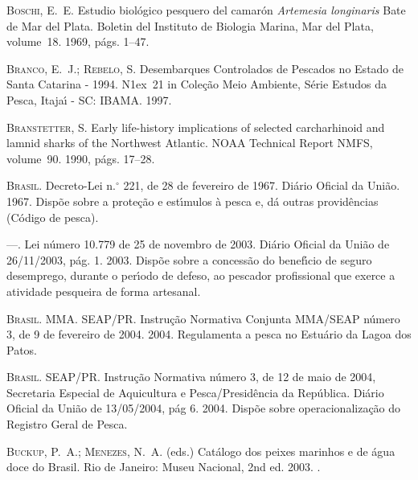 \documentclass[a4paper,11pt,twoside,showtrims,onecolumn,openright,final]{memoir}
\begin{document}
\begin{thebibliography}{194}
\textsc{Boschi, E.~E.}
\newblock Estudio biol\'ogico pesquero del camar\'on \emph{{A}rtemesia longinaris}
  {B}ate de {M}ar del {P}lata.
\newblock Boletin del Instituto de Biologia Marina, Mar del Plata, volume~18.
  1969, p\'ags. 1--47.

\textsc{Branco, E.~J.; Rebelo, S.}
\newblock Desembarques {C}ontrolados de {P}escados no {E}stado de {S}anta
  {C}atarina - 1994.
\newblock N\raise1ex\hbox{}~21 in Cole\c{c}\~ao Meio
  Ambiente, S\'erie Estudos da Pesca, Itaja\'{\i} - SC: IBAMA. 1997.

\textsc{Branstetter, S.}
\newblock Early life-history implications of selected carcharhinoid and lamnid
  sharks of the {N}orthwest {A}tlantic.
\newblock NOAA Technical Report NMFS, volume~90. 1990, p\'ags. 17--28.

\textsc{Brasil}.
\newblock Decreto-{L}ei n.\mbox{$^\circ$} 221, de 28 de fevereiro de 1967.
\newblock Di\'ario Oficial da Uni\~ao. 1967.
\newblock Disp\~oe sobre a prote\c{c}\~ao e est\'{\i}mulos \`a pesca e, d\'a
  outras provid\^encias (C\'odigo de pesca).

---.
\newblock Lei n\'umero 10.779 de 25 de novembro de 2003.
\newblock Di\'ario Oficial da Uni\~ao de 26/11/2003, p\'ag. 1. 2003.
\newblock Disp\~oe sobre a concess\~ao do benef\'{\i}cio de seguro desemprego,
  durante o per\'{\i}odo de defeso, ao pescador profissional que exerce a
  atividade pesqueira de forma artesanal.

\textsc{{Brasil. MMA. SEAP/PR}}.
\newblock Instru\c{c}\~ao {N}ormativa {C}onjunta {MMA}/{SEAP} n\'umero 3, de 9
  de fevereiro de 2004. 2004.
\newblock Regulamenta a pesca no Estu\'ario da Lagoa dos Patos.

\textsc{{Brasil. SEAP/PR}}.
\newblock Instru\c{c}\~ao {N}ormativa n\'umero 3, de 12 de maio de 2004,
  {S}ecretaria {E}special de {A}quicultura e {P}esca/{P}resid\^encia da
  {R}ep\'ublica.
\newblock Di\'ario Oficial da Uni\~ao de 13/05/2004, p\'ag 6. 2004.
\newblock Disp\~oe sobre operacionaliza\c{c}\~ao do Registro Geral de Pesca.

\textsc{Buckup, P.~A.; Menezes, N.~A.} (eds.) Cat\'alogo dos peixes marinhos e
  de \'agua doce do {B}rasil.
\newblock Rio de Janeiro: Museu Nacional, 2nd ed. 2003.
.


\end{thebibliography}
\end{document}
